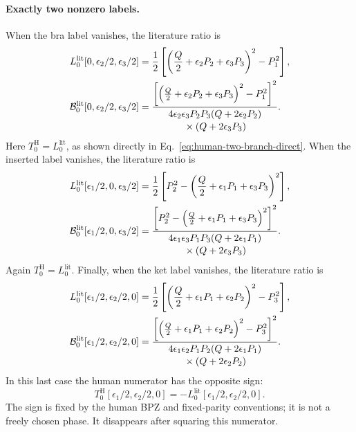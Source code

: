 \documentclass[11pt]{article}
\begin{document}
\paragraph{Exactly two nonzero labels.}
When the bra label vanishes, the literature ratio is
\begin{align}
 L_0^{\mathrm{lit}}[0,\epsilon_2/2,\epsilon_3/2]
 &=\frac12\left[
 \left(\frac Q2+\epsilon_2P_2+\epsilon_3P_3\right)^2-P_1^2
 \right],
 \notag\\
 \mathcal B_0^{\mathrm{lit}}[0,\epsilon_2/2,\epsilon_3/2]
 &=
 \frac{
 \left[
 \left(\frac Q2+\epsilon_2P_2+\epsilon_3P_3\right)^2-P_1^2
 \right]^2
 }{
 \begin{gathered}
 4\epsilon_2\epsilon_3P_2P_3
 (Q+2\epsilon_2P_2)\\[-0.2em]
 {}\times(Q+2\epsilon_3P_3)
 \end{gathered}
 }.
 \label{eq:small-n-bra-zero}
\end{align}
Here \(T_0^{\mathrm H}=L_0^{\mathrm{lit}}\), as shown directly in
Eq.~\eqref{eq:human-two-branch-direct}.  When the inserted label vanishes,
the literature ratio is
\begin{align}
 L_0^{\mathrm{lit}}[\epsilon_1/2,0,\epsilon_3/2]
 &=\frac12\left[
 P_2^2-
 \left(\frac Q2+\epsilon_1P_1+\epsilon_3P_3\right)^2
 \right],
 \notag\\
 \mathcal B_0^{\mathrm{lit}}[\epsilon_1/2,0,\epsilon_3/2]
 &=
 \frac{
 \left[
 P_2^2-
 \left(\frac Q2+\epsilon_1P_1+\epsilon_3P_3\right)^2
 \right]^2
 }{
 \begin{gathered}
 4\epsilon_1\epsilon_3P_1P_3
 (Q+2\epsilon_1P_1)\\[-0.2em]
 {}\times(Q+2\epsilon_3P_3)
 \end{gathered}
 }.
 \label{eq:small-n-insertion-zero}
\end{align}
Again \(T_0^{\mathrm H}=L_0^{\mathrm{lit}}\).  Finally, when the ket label
vanishes, the literature ratio is
\begin{align}
 L_0^{\mathrm{lit}}[\epsilon_1/2,\epsilon_2/2,0]
 &=\frac12\left[
 \left(\frac Q2+\epsilon_1P_1+\epsilon_2P_2\right)^2-P_3^2
 \right],
 \notag\\
 \mathcal B_0^{\mathrm{lit}}[\epsilon_1/2,\epsilon_2/2,0]
 &=
 \frac{
 \left[
 \left(\frac Q2+\epsilon_1P_1+\epsilon_2P_2\right)^2-P_3^2
 \right]^2
 }{
 \begin{gathered}
 4\epsilon_1\epsilon_2P_1P_2
 (Q+2\epsilon_1P_1)\\[-0.2em]
 {}\times(Q+2\epsilon_2P_2)
 \end{gathered}
 }.
 \label{eq:small-n-ket-zero}
\end{align}
In this last case the human numerator has the opposite sign:
\begin{equation}
 T_0^{\mathrm H}[\epsilon_1/2,\epsilon_2/2,0]
 =-L_0^{\mathrm{lit}}[\epsilon_1/2,\epsilon_2/2,0].
 \label{eq:small-n-human-ket-zero-sign}
\end{equation}
The sign is fixed by the human BPZ and fixed-parity conventions; it is not a
freely chosen phase.  It disappears after squaring this numerator.
\end{document}
